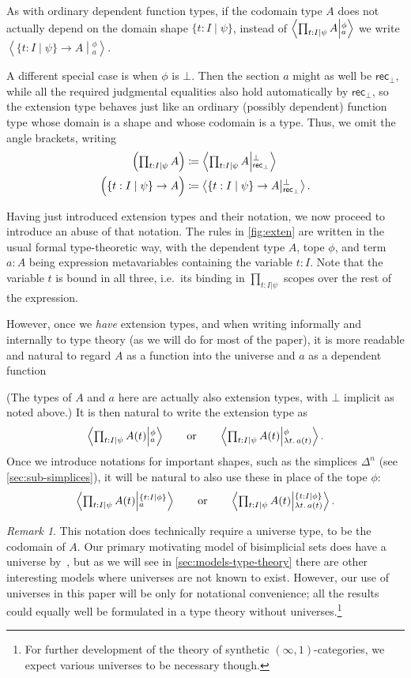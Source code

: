 \documentclass[12pt]{amsart}
\theoremstyle{plain}
\theoremstyle{definition}
\theoremstyle{remark}
\newtheorem{rmk}[thm]{Remark}
\numberwithin{equation}{section}
\newcommand{\tprod}{\textstyle\prod}
\newcommand{\exten}[4]{\left\langle\mathchoice{\textstyle\prod_{#1}}{\textstyle\prod_{#1}}{\scriptstyle\prod_{#1}}{\scriptscriptstyle\prod_{#1}} #2 \middle|^{#3}_{#4}\right\rangle}
\newcommand{\ndexten}[4]{\left\langle #1 \to #2 \middle|^{#3}_{#4}\right\rangle}
\newcommand{\defeq}{\coloneqq}
\newcommand{\univtype}{\mathcal{U}}
\newcommand{\sh}[2]{\{#1\mid #2\}}
\newcommand{\rec}{\mathsf{rec}}
\newcommand{\lam}[1]{\lambda #1.\,}
\newcommand{\Parens}[1]{\Bigl(#1\Bigr)}
\begin{document}
As with ordinary dependent function types, if the codomain type $A$ does not actually depend on the domain shape $\sh{t:I}{\psi}$, instead of $\exten{t:I \mid \psi}{A}{\phi}{a}$ we write $\ndexten{\sh{t:I}{\psi}}{A}{\phi}{a}$.

A different special case is when $\phi$ is $\bot$.
Then the section $a$ might as well be $\rec_\bot$, while all the required judgmental equalities also hold automatically by $\rec_\bot$, so the extension type behaves just like an ordinary (possibly dependent) function type whose domain is a shape and whose codomain is a type.
Thus, we omit the angle brackets, writing
\begin{align}
  \Parens{\tprod_{t:I|\psi} A} &\defeq \exten{t:I|\psi}{A}{\bot}{\rec_\bot}\label{eq:exten-bot}\\
  \Parens{\sh{t:I}{\psi} \to A} &\defeq \ndexten{\sh{t:I}{\psi}}{A}{\bot}{\rec_\bot}.\label{eq:ndexten-bot}
\end{align}

Having just introduced extension types and their notation, we now proceed to introduce an abuse of that notation.
The rules in \cref{fig:exten} are written in the usual formal type-theoretic way, with the dependent type $A$, tope $\phi$, and term $a:A$ being expression metavariables containing the variable $t:I$.
Note that the variable $t$ is bound in all three, i.e.\ its binding in $\prod_{t:I|\psi}$ scopes over the rest of the expression.

However, once we \emph{have} extension types, and when writing informally and internally to type theory (as we will do for most of the paper), it is more readable and natural to regard $A$ as a function into the universe and $a$ as a dependent function
(The types of $A$ and $a$ here are actually also extension types, with $\bot$ implicit as noted above.)
It is then natural to write the extension type as
\[ \exten{t:I\mid\psi}{A(t)}{\phi}{a} \qquad\text{or}\qquad \exten{t:I\mid\psi}{A(t)}{\phi}{\lam{t}a(t)}. \]
Once we introduce notations for important shapes, such as the simplices $\Delta^n$ (see \cref{sec:sub-simplices}), it will be natural to also use these in place of the tope $\phi$:
\[ \exten{t:I\mid\psi}{A(t)}{\sh{t:I}{\phi}}{a} \qquad\text{or}\qquad \exten{t:I\mid\psi}{A(t)}{\sh{t:I}{\phi}}{\lam{t}a(t)}. \]

\begin{rmk}\label{sec:notation}
This notation does technically require a universe type, to be the codomain of $A$.
Our primary motivating model of bisimplicial sets does have a universe by~\cite{elreedy}, but as we will see in \cref{sec:models-type-theory} there are other interesting models where universes are not known to exist.
However, our use of universes in this paper will be only for notational convenience; all the results could equally well be formulated in a type theory without universes.\footnote{For further development of the theory of synthetic $(\infty,1)$-categories, we expect various universes to be necessary though.}
\end{rmk}
\end{document}

